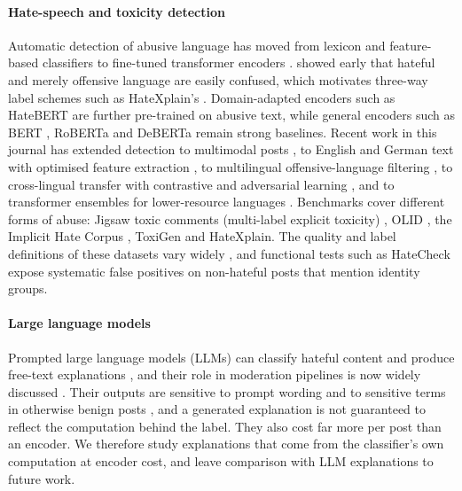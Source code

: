 \documentclass[preprint,12pt,authoryear]{elsarticle}
\begin{document}
\paragraph{Hate-speech and toxicity detection}
Automatic detection of abusive language has moved from lexicon and feature-based classifiers to fine-tuned transformer encoders \citep{fortuna2018survey,mishra2024shielding}. \citet{davidson2017automated} showed early that hateful and merely offensive language are easily confused, which motivates three-way label schemes such as HateXplain's \citep{mathew2021hatexplain}. Domain-adapted encoders such as HateBERT \citep{caselli2021hatebert} are further pre-trained on abusive text, while general encoders such as BERT \citep{devlin2019bert}, RoBERTa \citep{liu2019roberta} and DeBERTa \citep{he2021deberta} remain strong baselines. Recent work in this journal has extended detection to multimodal posts \citep{chhabra2023multimodal}, to English and German text with optimised feature extraction \citep{kar2023sentimental}, to multilingual offensive-language filtering \citep{saumya2024filtering}, to cross-lingual transfer with contrastive and adversarial learning \citep{almahdi2025crosslingual}, and to transformer ensembles for lower-resource languages \citep{aksoy2026turkish}. Benchmarks cover different forms of abuse: Jigsaw toxic comments (multi-label explicit toxicity) \citep{jigsaw2018toxic}, OLID \citep{zampieri2019olid}, the Implicit Hate Corpus \citep{elsherief2021latent}, ToxiGen \citep{hartvigsen2022toxigen} and HateXplain. The quality and label definitions of these datasets vary widely \citep{vidgen2020directions}, and functional tests such as HateCheck \citep{rottger2021hatecheck} expose systematic false positives on non-hateful posts that mention identity groups.

\paragraph{Large language models}
Prompted large language models (LLMs) can classify hateful content and produce free-text explanations \citep{huang2023chatgpt,roy2023probing}, and their role in moderation pipelines is now widely discussed \citep{ahmad2026detection}. Their outputs are sensitive to prompt wording and to sensitive terms in otherwise benign posts \citep{roy2023probing}, and a generated explanation is not guaranteed to reflect the computation behind the label. They also cost far more per post than an encoder. We therefore study explanations that come from the classifier's own computation at encoder cost, and leave comparison with LLM explanations to future work.
\end{document}
